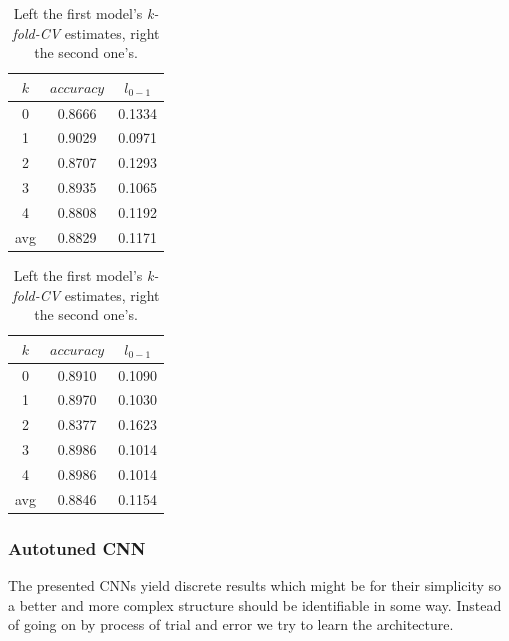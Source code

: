 \begin{table}
    \centering
    \begin{tabular}{ | c | c | c | }
        \hline
        $k$ & $accuracy$ & $l_{0-1}$ \\
        \hline\hline
        0   & 0.8666     & 0.1334    \\
        \hline
        1   & 0.9029     & 0.0971    \\
        \hline
        2   & 0.8707     & 0.1293    \\
        \hline
        3   & 0.8935     & 0.1065    \\
        \hline
        4   & 0.8808     & 0.1192    \\
        \hline
        \hline
        avg & 0.8829     & 0.1171    \\
        \hline
    \end{tabular}
    \quad
    \begin{tabular}{| c | c | c |}
        \hline
        $k$ & $accuracy$ & $l_{0-1}$ \\
        \hline\hline
        0   & 0.8910     & 0.1090    \\
        \hline
        1   & 0.8970     & 0.1030    \\
        \hline
        2   & 0.8377     & 0.1623    \\
        \hline
        3   & 0.8986     & 0.1014    \\
        \hline
        4   & 0.8986     & 0.1014    \\
        \hline
        \hline
        avg & 0.8846     & 0.1154    \\
        \hline
    \end{tabular}
    \caption{
        Left the first model's \textit{k-fold-CV} estimates, right the second one's.
    }

    \label{tab:kfoldcnn}
\end{table}

\subsubsection{Autotuned CNN}
\label{subsubsec:autotuned}
The presented CNNs yield discrete results which might be for their simplicity so a better and more
complex structure should be identifiable in some way.
Instead of going on by process of trial and error we try to learn the architecture.

